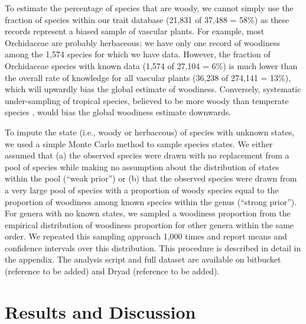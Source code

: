 \documentclass[a4paper,12pt]{article}
\begin{document}
To estimate the percentage of species that are woody, we cannot simply
use the fraction of species within our trait database (21,831 of
37,488 = 58\%) as these records represent a biased sample of vascular
plants.
For example, most Orchidaceae are probably herbaceous; we have only
one record of woodiness among the 1,574 species for which we have
data.
However, the fraction of Orchidaceae species with known data (1,574 of
27,104 = 6\%)
is much lower than the overall rate of knowledge for all vascular
plants (36,238 of 274,141 = 13\%), which will upwardly bias the global
estimate of woodiness.
%
Conversely, systematic under-sampling of tropical species, believed to
be more woody than temperate species \citep{Molesheihgt}, would bias
the global woodiness estimate downwards.

To impute the state (i.e., woody or herbaceous) of species with
unknown states, we used a simple Monte Carlo method to sample species
states.  We either assumed that (a) the observed species were drawn
with no replacement from a pool of species while making no assumption
about the distribution of states within the pool (``weak prior'') or
(b) that the observed species were drawn from a very large pool of
species with a proportion of woody species equal to the proportion of
woodiness among known species within the genus (``strong prior'').
%
For genera with no known states, we sampled a woodiness proportion
from the empirical distribution of woodiness proportion for other
genera within the same order.
%
We repeated this sampling approach 1,000 times and report means and
confidence intervals over this distribution.
%
This procedure is described in detail in the appendix.  The analysis
script and full dataset are available on bitbucket (reference to be
added) and Dryad (reference to be added).


\section{Results and Discussion}
\end{document}

